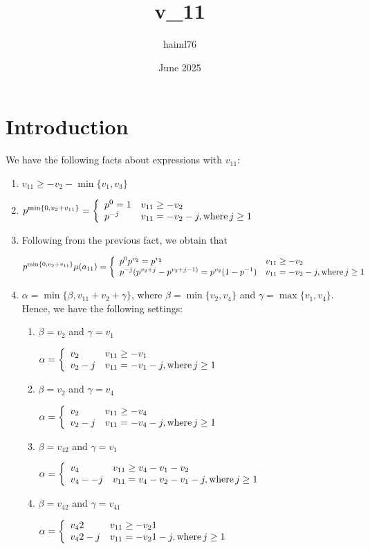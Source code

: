 \documentclass{article}
\title{v_{11}}
\author{haiml76 }
\date{June 2025}
\begin{document}

\section{Introduction}
We have the following facts about expressions with $v_{11}$:
\begin{enumerate}
    \item 
$v_{11}\geq{-v_2-\min\{v_1,v_3\}}$
\item $p^{\min\{0,v_2+v_{11}\}}=\left\{
	\begin{array}{ll}
		p^{0}=1  & v_{11}\geq{-v_2} \\
		  p^{-j} & v_{11}=-v_2-j, \text{where\,}j\geq{1}
	\end{array}
\right.$
\item Following from the previous fact, we obtain that

$p^{\min\{0,v_2+v_{11}\}}\mu(a_{11})=\left\{
	\begin{array}{ll}
		p^0p^{v_2}=p^{v_2}  & v_{11}\geq{-v_2} \\
		  p^{-j}(p^{v_2+j}-p^{v_2+j-1)}=p^{v_2}(1-p^{-1}) & v_{11}=-v_2-j, \text{where\,}j\geq{1}
	\end{array}
\right.$
\item $\alpha=\min\{\beta,v_{11}+v_2+\gamma\}$, where $\beta=\min\{v_2,v_4\}$ and $\gamma=\max\{v_1,v_4\}$.
Hence, we have the following settings:
\begin{enumerate}
    \item $\beta=v_2$ and $\gamma=v_1$

$\alpha=\left\{
	\begin{array}{ll}
            v_2  & v_{11}\geq{-v_1} \\
		  v_2-j & v_{11}=-v_1-j, \text{where\,}j\geq{1}
	\end{array}
\right.$    
\item $\beta=v_2$ and $\gamma=v_4$

$\alpha=\left\{
	\begin{array}{ll}
            v_2  & v_{11}\geq{-v_4} \\
		  v_2-j & v_{11}=-v_4-j, \text{where\,}j\geq{1}
	\end{array}
\right.$    
\item $\beta=v_42$ and $\gamma=v_1$

$\alpha=\left\{
	\begin{array}{ll}
            v_4  & v_{11}\geq{v_4-v_1-v_2} \\
		  v_4--j & v_{11}=v_4-v_2-v_1-j, \text{where\,}j\geq{1}
	\end{array}
\right.$    
\item $\beta=v_42$ and $\gamma=v_41$

$\alpha=\left\{
	\begin{array}{ll}
            v_42  & v_{11}\geq{-v_21} \\
		  v_42-j & v_{11}=-v_21-j, \text{where\,}j\geq{1}
	\end{array}
\right.$
\end{enumerate}
\end{enumerate}
\end{document}
